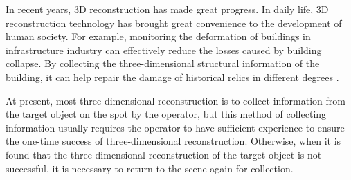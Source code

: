 \documentclass[journal]{IEEEtran}
\begin{document}
%




In recent years, 3D reconstruction has made great progress. 
In daily life, 3D reconstruction technology has brought great 
convenience to the development of human society. For example, 
monitoring the deformation of buildings in infrastructure industry\cite{Wang2012COSMO}
can effectively reduce the losses caused by building collapse. 
By collecting the three-dimensional structural information of the building, 
it can help repair the damage of historical relics in different degrees \cite{KerstenPotential}.

At present, most three-dimensional reconstruction is to collect 
information from the target object on the spot by the operator, 
but this method of collecting information usually requires the 
operator to have sufficient experience to ensure the one-time 
success of three-dimensional reconstruction. Otherwise, when it is 
found that the three-dimensional reconstruction of the target object 
is not successful, it is necessary to return to the scene again for collection.
\end{document}
